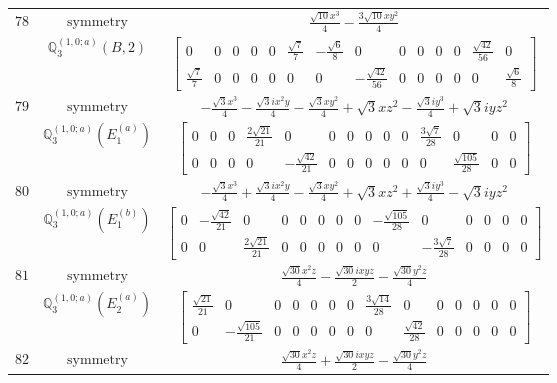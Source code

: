\documentclass[fleqn,8pt,landscape]{jsarticle}
\begin{document}
\begin{longtable}{ccc}
$ 78 $ & $ \text{symmetry} $ & $ \frac{\sqrt{10} x^{3}}{4} - \frac{3 \sqrt{10} x y^{2}}{4} $ \\
$  $ & $ \mathbb{Q}_{3}^{(1,0;a)}(B,2) $ & $ \begin{bmatrix} 0 & 0 & 0 & 0 & 0 & \frac{\sqrt{7}}{7} & - \frac{\sqrt{6}}{8} & 0 & 0 & 0 & 0 & 0 & \frac{\sqrt{42}}{56} & 0 \\ \frac{\sqrt{7}}{7} & 0 & 0 & 0 & 0 & 0 & 0 & - \frac{\sqrt{42}}{56} & 0 & 0 & 0 & 0 & 0 & \frac{\sqrt{6}}{8} \end{bmatrix} $ \\ \hline
$ 79 $ & $ \text{symmetry} $ & $ - \frac{\sqrt{3} x^{3}}{4} - \frac{\sqrt{3} i x^{2} y}{4} - \frac{\sqrt{3} x y^{2}}{4} + \sqrt{3} x z^{2} - \frac{\sqrt{3} i y^{3}}{4} + \sqrt{3} i y z^{2} $ \\
$  $ & $ \mathbb{Q}_{3}^{(1,0;a)}(E_{1}^{(a)}) $ & $ \begin{bmatrix} 0 & 0 & 0 & \frac{2 \sqrt{21}}{21} & 0 & 0 & 0 & 0 & 0 & 0 & \frac{3 \sqrt{7}}{28} & 0 & 0 & 0 \\ 0 & 0 & 0 & 0 & - \frac{\sqrt{42}}{21} & 0 & 0 & 0 & 0 & 0 & 0 & \frac{\sqrt{105}}{28} & 0 & 0 \end{bmatrix} $ \\ \hline
$ 80 $ & $ \text{symmetry} $ & $ - \frac{\sqrt{3} x^{3}}{4} + \frac{\sqrt{3} i x^{2} y}{4} - \frac{\sqrt{3} x y^{2}}{4} + \sqrt{3} x z^{2} + \frac{\sqrt{3} i y^{3}}{4} - \sqrt{3} i y z^{2} $ \\
$  $ & $ \mathbb{Q}_{3}^{(1,0;a)}(E_{1}^{(b)}) $ & $ \begin{bmatrix} 0 & - \frac{\sqrt{42}}{21} & 0 & 0 & 0 & 0 & 0 & 0 & - \frac{\sqrt{105}}{28} & 0 & 0 & 0 & 0 & 0 \\ 0 & 0 & \frac{2 \sqrt{21}}{21} & 0 & 0 & 0 & 0 & 0 & 0 & - \frac{3 \sqrt{7}}{28} & 0 & 0 & 0 & 0 \end{bmatrix} $ \\ \hline
$ 81 $ & $ \text{symmetry} $ & $ \frac{\sqrt{30} x^{2} z}{4} - \frac{\sqrt{30} i x y z}{2} - \frac{\sqrt{30} y^{2} z}{4} $ \\
$  $ & $ \mathbb{Q}_{3}^{(1,0;a)}(E_{2}^{(a)}) $ & $ \begin{bmatrix} \frac{\sqrt{21}}{21} & 0 & 0 & 0 & 0 & 0 & 0 & \frac{3 \sqrt{14}}{28} & 0 & 0 & 0 & 0 & 0 & 0 \\ 0 & - \frac{\sqrt{105}}{21} & 0 & 0 & 0 & 0 & 0 & 0 & \frac{\sqrt{42}}{28} & 0 & 0 & 0 & 0 & 0 \end{bmatrix} $ \\ \hline
$ 82 $ & $ \text{symmetry} $ & $ \frac{\sqrt{30} x^{2} z}{4} + \frac{\sqrt{30} i x y z}{2} - \frac{\sqrt{30} y^{2} z}{4} $ \\

\end{longtable}
\end{document}
